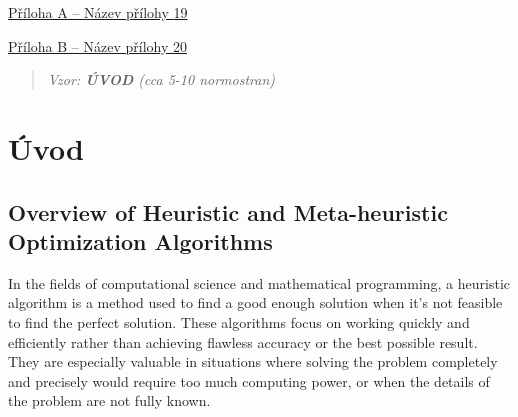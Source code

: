 \documentclass[
]{article}
\begin{document}
\protect\hyperlink{pux159uxedloha-a-nuxe1zev-pux159uxedlohy}{Příloha A
-- Název přílohy
\protect\hyperlink{pux159uxedloha-a-nuxe1zev-pux159uxedlohy}{19}}

\protect\hyperlink{pux159uxedloha-b-nuxe1zev-pux159uxedlohy}{Příloha B
-- Název přílohy
\protect\hyperlink{pux159uxedloha-b-nuxe1zev-pux159uxedlohy}{20}}

\newpage
\begin{quote}
\emph{Vzor: \textbf{ÚVOD} (cca 5-10 normostran)}
\end{quote}

\hypertarget{section-1}{%
\subsection{}\label{section-1}}

\hypertarget{uxfavod}{%
\section{Úvod}\label{uxfavod}}

\newpage


\hypertarget{nadpis-uxfarovnux11b-2}{%
\subsection{Overview of Heuristic and Meta-heuristic Optimization Algorithms}\label{nadpis-uxfarovnux11b-2}}



  In the fields of computational science and mathematical programming, a heuristic algorithm is a method used to find a good enough solution when it's not feasible to find the perfect solution. These algorithms focus on working quickly and efficiently rather than achieving flawless accuracy or the best possible result. They are especially valuable in situations where solving the problem completely and precisely would require too much computing power, or when the details of the problem are not fully known.
\end{document}
